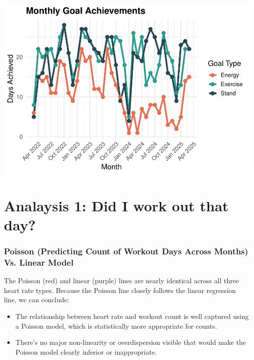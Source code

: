 \documentclass[
  11pt,
]{article}
\providecommand{\tightlist}{%
  \setlength{\itemsep}{0pt}\setlength{\parskip}{0pt}}
\begin{document}
\includegraphics{analysis_files/figure-latex/unnamed-chunk-7-1.pdf}

\section{Analaysis 1: Did I work out that
day?}\label{analaysis-1-did-i-work-out-that-day}

\subsubsection{Poisson (Predicting Count of Workout Days Across Months)
Vs. Linear
Model}\label{poisson-predicting-count-of-workout-days-across-months-vs.-linear-model}

The Poisson (red) and linear (purple) lines are nearly identical across
all three heart rate types. Because the Poisson line closely follows the
linear regression line, we can conclude:

\begin{itemize}
\tightlist
\item
  The relationship between heart rate and workout count is well captured
  using a Poisson model, which is statistically more appropriate for
  counts.
\item
  There's no major non-linearity or overdispersion visible that would
  make the Poisson model clearly inferior or inappropriate.
\end{itemize}
\end{document}
